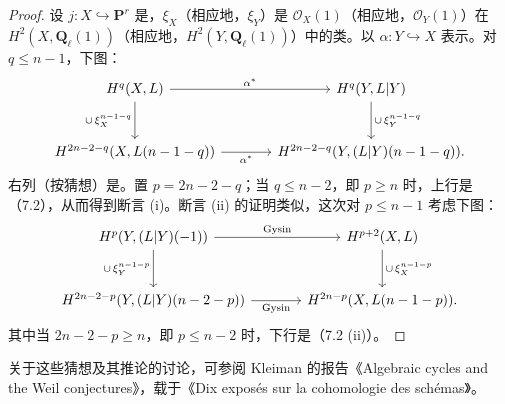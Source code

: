 \begin{proof}
设 $j:X\hookrightarrow\mathbf P^r$ 是，$\xi_X$（相应地，$\xi_Y$）是 $\mathscr O_X(1)$（相应地，$\mathscr O_Y(1)$）在 $H^2(X,\mathbf Q_\ell(1))$（相应地，$H^2(Y,\mathbf Q_\ell(1))$）中的类。以 $\alpha:Y\hookrightarrow X$ 表示。对 $q\le n-1$，下图：
\[
\begin{tikzcd}[column sep=large,row sep=large]
 H^q(X,L)\arrow[r,"\alpha^*"]\arrow[d,"{\cup\,\xi_X^{n-1-q}}"']
 &H^q(Y,L|Y)\arrow[d,"{\cup\,\xi_Y^{n-1-q}}"]\\
 H^{2n-2-q}(X,L(n-1-q))\arrow[r,"\alpha^*"']
 &H^{2n-2-q}(Y,(L|Y)(n-1-q)).
\end{tikzcd}
\]
右列（按猜想）是。置 $p=2n-2-q$；当 $q\le n-2$，即 $p\ge n$ 时，上行是（7.2），从而得到断言 (i)。断言 (ii) 的证明类似，这次对 $p\le n-1$ 考虑下图：
\[
\begin{tikzcd}[column sep=large,row sep=large]
 H^p(Y,(L|Y)(-1))\arrow[r,"\mathrm{Gysin}"]\arrow[d,"{\cup\,\xi_Y^{n-1-p}}"']
 &H^{p+2}(X,L)\arrow[d,"{\cup\,\xi_X^{n-1-p}}"]\\
 H^{2n-2-p}(Y,(L|Y)(n-2-p))\arrow[r,"\mathrm{Gysin}"']
 &H^{2n-p}(X,L(n-1-p)).
\end{tikzcd}
\]
其中当 $2n-2-p\ge n$，即 $p\le n-2$ 时，下行是（7.2 (ii)）。
\end{proof}

关于这些猜想及其推论的讨论，可参阅 Kleiman 的报告《Algebraic cycles and the Weil conjectures》，载于《Dix exposés sur la cohomologie des schémas》。
